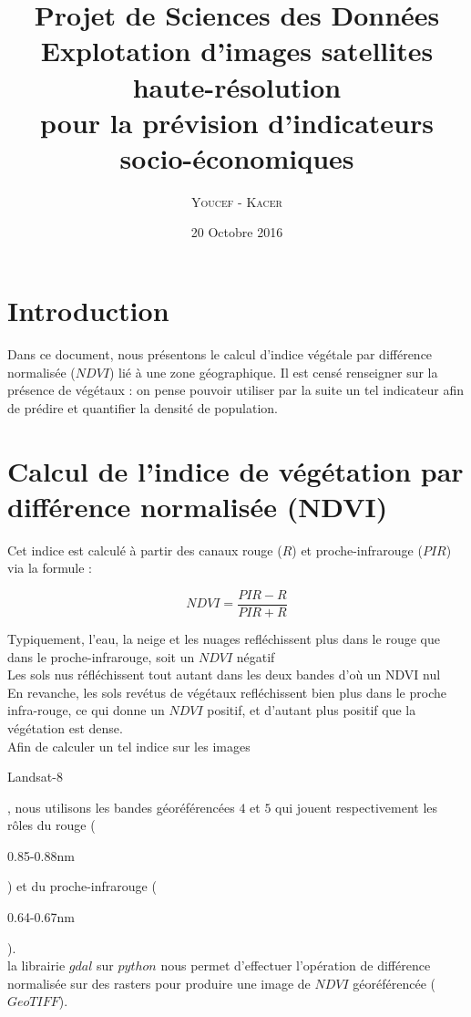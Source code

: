 \documentclass{book}
\title{%
  Projet de Sciences des Données \\
  \large Explotation d'images satellites haute-résolution \\pour la prévision d'indicateurs socio-économiques \\
    }
\author{\textsc{Youcef} - \textsc{Kacer}}
\date{20 Octobre 2016}
\begin{document}
 
\maketitle

\tableofcontents

\frontmatter
\chapter{Introduction}
Dans ce document, nous présentons le calcul d'indice végétale par différence normalisée ($NDVI$) lié à une zone géographique. Il est censé renseigner sur la présence de végétaux :
on pense pouvoir utiliser par la suite un tel indicateur afin de prédire et quantifier la densité de population. 

\mainmatter
\chapter{Calcul de l'indice de végétation par différence normalisée (NDVI)}

Cet indice est calculé à partir des canaux
rouge ($R$) et proche-infrarouge ($PIR$) via la formule : 

\[NDVI=\frac{PIR-R}{PIR+R}\]

Typiquement, l'eau, la neige et les nuages refléchissent plus dans le rouge que dans le proche-infrarouge, soit un $NDVI$ négatif\\
Les sols nus réfléchissent tout autant dans les deux bandes d'où un NDVI nul\\
En revanche, les sols revétus de végétaux refléchissent bien plus dans le proche infra-rouge, ce qui donne un $NDVI$ positif, et d'autant
plus positif que la végétation est dense.\\
Afin de calculer un tel indice sur les images \begin{itshape}Landsat-8\end{itshape}, nous utilisons les bandes géoréférencées $4$ et $5$ 
qui jouent respectivement les r\^oles du rouge (\begin{itshape}0.85-0.88nm\end{itshape}) et du proche-infrarouge (\begin{itshape}0.64-0.67nm\end{itshape}).\\
la librairie $gdal$ sur $python$ nous permet d'effectuer l'opération de différence normalisée sur des rasters pour produire une image de $NDVI$ géoréférencée ($GeoTIFF$).
\end{document}
